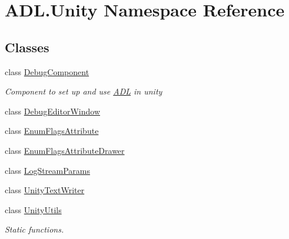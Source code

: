 \hypertarget{namespace_a_d_l_1_1_unity}{}\section{A\+D\+L.\+Unity Namespace Reference}
\label{namespace_a_d_l_1_1_unity}
\subsection*{Classes}
\begin{DoxyCompactItemize}
\item 
class \mbox{\hyperlink{class_a_d_l_1_1_unity_1_1_debug_component}{Debug\+Component}}
\begin{DoxyCompactList}\small\item\em Component to set up and use \mbox{\hyperlink{namespace_a_d_l}{A\+DL}} in unity \end{DoxyCompactList}\item 
class \mbox{\hyperlink{class_a_d_l_1_1_unity_1_1_debug_editor_window}{Debug\+Editor\+Window}}
\item 
class \mbox{\hyperlink{class_a_d_l_1_1_unity_1_1_enum_flags_attribute}{Enum\+Flags\+Attribute}}
\item 
class \mbox{\hyperlink{class_a_d_l_1_1_unity_1_1_enum_flags_attribute_drawer}{Enum\+Flags\+Attribute\+Drawer}}
\item 
class \mbox{\hyperlink{class_a_d_l_1_1_unity_1_1_log_stream_params}{Log\+Stream\+Params}}
\item 
class \mbox{\hyperlink{class_a_d_l_1_1_unity_1_1_unity_text_writer}{Unity\+Text\+Writer}}
\item 
class \mbox{\hyperlink{class_a_d_l_1_1_unity_1_1_unity_utils}{Unity\+Utils}}
\begin{DoxyCompactList}\small\item\em Static functions. \end{DoxyCompactList}\end{DoxyCompactItemize}
